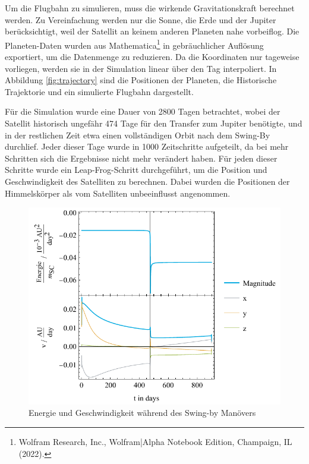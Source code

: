 Um die Flugbahn zu simulieren, muss die wirkende Gravitationskraft berechnet werden.
Zu Vereinfachung werden nur die Sonne, die Erde und der Jupiter berücksichtigt, weil der Satellit an keinem anderen Planeten nahe vorbeiflog.
Die Planeten-Daten wurden aus Mathematica\footnote{Wolfram Research, Inc., Wolfram|Alpha Notebook Edition, Champaign, IL (2022).} in gebräuchlicher Auflösung exportiert, um die Datenmenge zu reduzieren.
Da die Koordinaten nur tageweise vorliegen, werden sie in der Simulation linear über den Tag interpoliert.
In Abbildung \ref{fig:trajectory} sind die Positionen der Planeten, die Historische Trajektorie und ein simulierte Flugbahn dargestellt.

Für die Simulation wurde eine Dauer von 2800 Tagen betrachtet, wobei der Satellit historisch ungefähr 474 Tage für den Transfer zum Jupiter benötigte, und in der restlichen Zeit etwa einen vollständigen Orbit nach dem Swing-By durchlief.
Jeder dieser Tage wurde in 1000 Zeitschritte aufgeteilt, da bei mehr Schritten sich die Ergebnisse nicht mehr verändert haben.
Für jeden dieser Schritte wurde ein Leap-Frog-Schritt durchgeführt, um die Position und Geschwindigkeit des Satelliten zu berechnen. Dabei wurden die Positionen der Himmelskörper als vom Satelliten unbeeinflusst angenommen.


\begin{figure}[h!]
	\centering
	\includegraphics{img/energy.pdf}
	\caption{Energie und Geschwindigkeit während des Swing-by Manövers}
\end{figure}


